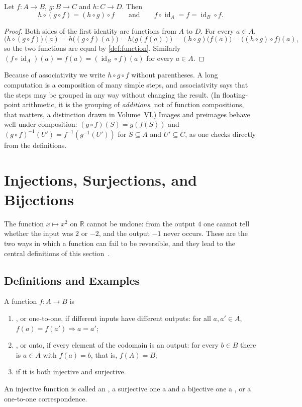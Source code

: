 \begin{proposition}
\label{prop:composition}
Let $f\colon A\to B$, $g\colon B\to C$ and $h\colon C\to D$. Then
\[
h\circ(g\circ f)=(h\circ g)\circ f
\qquad\text{and}\qquad
f\circ\operatorname{id}_A=f=\operatorname{id}_B\circ f .
\]
\end{proposition}

\begin{proof}
Both sides of the first identity are functions from $A$ to $D$. For every $a\in A$,
\[
\bigl(h\circ(g\circ f)\bigr)(a)=h\bigl((g\circ f)(a)\bigr)=h\bigl(g(f(a))\bigr)
=(h\circ g)\bigl(f(a)\bigr)=\bigl((h\circ g)\circ f\bigr)(a),
\]
so the two functions are equal by \cref{def:function}. Similarly $(f\circ\operatorname{id}_A)(a)=f(a)=(\operatorname{id}_B\circ f)(a)$ for every $a\in A$.
\end{proof}

Because of associativity we write $h\circ g\circ f$ without parentheses. A long computation is a composition of many simple steps, and associativity says that the steps may be grouped in any way without changing the result. (In floating-point arithmetic, it is the grouping of \emph{additions}, not of function compositions, that matters, a distinction drawn in Volume~VI.) Images and preimages behave well under composition: $(g\circ f)(S)=g(f(S))$ and $(g\circ f)^{-1}(U')=f^{-1}(g^{-1}(U'))$ for $S\subseteq A$ and $U'\subseteq C$, as one checks directly from the definitions.

\section{Injections, Surjections, and Bijections}
\label{sec:injections}

The function $x\mapsto x^2$ on $\mathbb R$ cannot be undone: from the output $4$ one cannot tell whether the input was $2$ or $-2$, and the output $-1$ never occurs. These are the two ways in which a function can fail to be reversible, and they lead to the central definitions of this section~\cite{velleman2019,halmos1960naive}.

\subsection{Definitions and Examples}

\begin{definition}
\label{def:injective}
A function $f\colon A\to B$ is
\begin{enumerate}
\item {}, or one-to-one, if different inputs have different outputs: for all $a,a'\in A$, $f(a)=f(a')\Rightarrow a=a'$;
\item {}, or onto, if every element of the codomain is an output: for every $b\in B$ there is $a\in A$ with $f(a)=b$, that is, $f(A)=B$;
\item {} if it is both injective and surjective.
\end{enumerate}
An injective function is called an , a surjective one a  and a bijective one a , or a one-to-one correspondence.
\end{definition}

